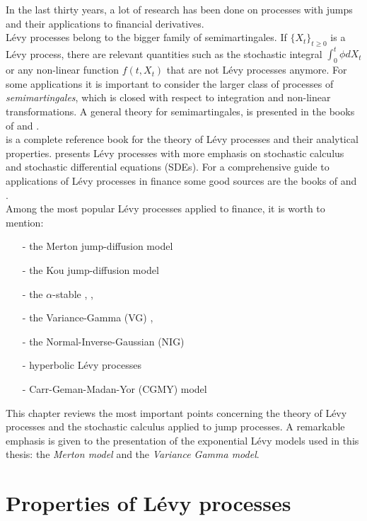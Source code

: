In the last thirty years, a lot of research has been done on processes with jumps and their applications to financial derivatives.\\
Lévy processes belong to the bigger family of semimartingales.
If $\{X_t\}_{t \ge 0}$ is a Lévy process, there are relevant quantities such as the stochastic integral $\int_0^t \phi dX_t$ or any non-linear function
$f(t,X_t)$ that are not Lévy processes anymore. For some applications it is important to consider the larger class of processes of \emph{semimartingales}, which is closed
with respect to integration and non-linear transformations.
A general theory for semimartingales, is presented in the books 
of \cite{Protter} and \cite{JacodShi}.\\
\cite{Sato} is a complete reference book for the theory of Lévy
processes and their analytical properties. 
\cite{Applebaum} presents Lévy processes with more emphasis on stochastic calculus and stochastic differential equations (SDEs).
For a comprehensive guide to applications of Lévy processes in finance some good sources are the books of 
\cite{Cont} and \cite{Schoutens}.\\ 
Among the most popular Lévy processes applied to finance, it is worth to mention:
\begin{itemize}
 \item[-] the Merton jump-diffusion model \cite{Me76}
 \item[-] the Kou jump-diffusion model \cite{Kou02}
 \item[-] the $\alpha$-stable \cite{Ma63}, \cite{BoPoCo97}, \cite{alpha09}
 \item[-] the Variance-Gamma (VG) \cite{MaSe90}, \cite{MCC98}
 \item[-] the Normal-Inverse-Gaussian (NIG) \cite{BN97}
 \item[-] hyperbolic Lévy processes \cite{EbKe95}
 \item[-] Carr-Geman-Madan-Yor (CGMY) model \cite{CGMY02}
\end{itemize}
This chapter reviews the most important points concerning the theory of Lévy processes and the stochastic calculus applied to jump processes.
A remarkable emphasis is given to the presentation of the exponential Lévy models used in this thesis: 
the \emph{Merton model} and the \emph{Variance Gamma model}.

\section{Properties of Lévy processes}

